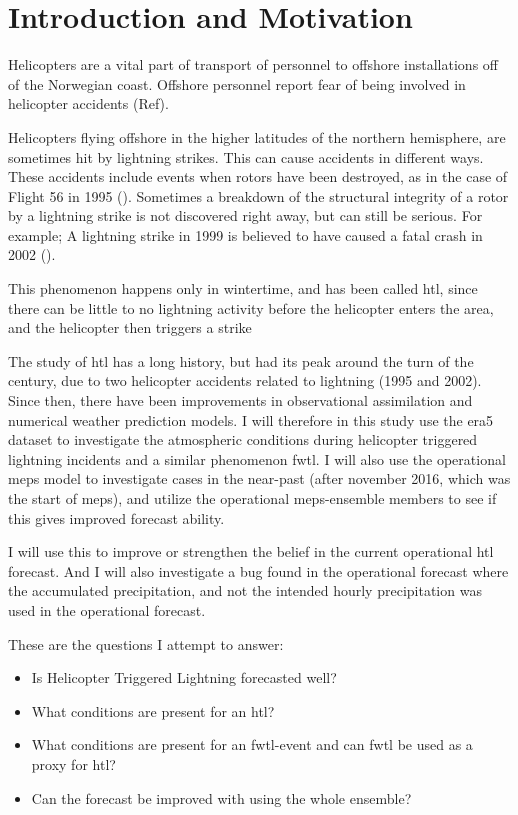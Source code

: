 \chapter{Introduction and Motivation}\label{ch:introduction}
Helicopters are a vital part of transport of personnel to offshore installations off of the Norwegian coast.  Offshore personnel report fear of being involved in helicopter accidents (Ref).

Helicopters flying offshore in the higher latitudes of the northern hemisphere, are sometimes hit by lightning strikes. This can cause accidents in different ways. These accidents include events when rotors have been destroyed, as in the case of Flight 56 in 1995 (\cite{flight56}). Sometimes a breakdown of the structural integrity of a rotor by a lightning strike is not discovered right away, but can still be serious. For example; A lightning strike in 1999 is believed to have caused a fatal crash in 2002 (\cite{laterhit}). 

This phenomenon happens only in wintertime, and has been called \acrfull{htl}, since there can be little to no lightning activity before the helicopter enters the area, and the helicopter then triggers a strike

The study of \acrshort{htl} has a long history, but had its peak around the turn of the century, due to two helicopter accidents related to lightning (1995 and 2002). Since then, there have been improvements in observational assimilation and numerical weather prediction models. I will therefore in this study use the \acrfull{era5} dataset to investigate the atmospheric conditions during helicopter triggered lightning incidents and a similar phenomenon \acrfull{fwtl}. I will also use the operational \acrfull{meps} model to investigate cases in the near-past (after november 2016, which was the start of \acrshort{meps}), and utilize the operational \acrshort{meps}-ensemble members to see if this gives improved forecast ability.

I will use this to improve or strengthen the belief in the current operational \acrshort{htl} forecast. And I will also investigate a bug found in the operational forecast where the accumulated precipitation, and not the intended hourly precipitation was used in the operational forecast.

These are the questions I attempt to answer:
\begin{itemize}
    \item Is Helicopter Triggered Lightning forecasted well?
    \item What conditions are present for an \acrshort{htl}?
    \item What conditions are present for an \acrshort{fwtl}-event and can \acrshort{fwtl} be used as a proxy for \acrshort{htl}? 
    \item Can the forecast be improved with using the whole ensemble?
\end{itemize}





